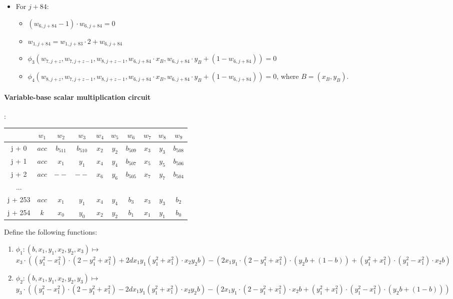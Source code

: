 \begin{itemize}
    \item For $j + 84$:
        \begin{itemize}
        	 \item $(w_{6, j + 84} - 1) \cdot w_{6, j + 84} = 0$ 
            \item $w_{1, j + 84} = w_{1, j + 83} \cdot 2 + w_{6, j + 84}$
            \item $\phi_3(w_{7, j + z}, w_{7, j + z - 1}, w_{8, j + z - 1}, w_{6, j + 84} \cdot x_B, w_{6, j + 84} \cdot y_B + (1 - w_{6, j + 84}) ) = 0$
            \item $\phi_4(w_{8, j + z}, w_{7, j + z - 1}, w_{8, j + z - 1}, w_{6, j + 84} \cdot x_B, w_{6, j + 84} \cdot y_B + (1 - w_{6, j + 84}) ) = 0$, where $B = (x_B, y_B)$.
        \end{itemize}
\end{itemize}

\paragraph{Variable-base scalar multiplication circuit}:
\begin{center}
    \begin{tabular}{ c|c|c|c|c|c|c|c|c|c }
        & $w_1$  & $w_2$  & $w_3$  & $w_4$  & $w_5$  & $w_6$ & $w_7$ & $w_8$ & $w_9$  \\
        \hline
        j + 0  & $acc$  & $b_{511}$ & $b_{510}$ & $x_2$   & $y_2$ & $b_{509}$  & $x_3$ & $y_3$ & $b_{508}$    \\
        j + 1  & $acc$ & $x_1$  & $ y_1$  & $x_4$ & $ y_4$ & $b_{507}$  & $x_5$ & $y_5$ & $b_{506}$ \\
        j + 2  & $acc$  & $--$ & $--$  & $x_6$ & $y_6$ & $b_{505}$ & $x_7$ & $y_7$  & $b_{504}$  \\
        ...     &             &            &           &             &           \\
        j + 253  & $acc$ & $x_1$  & $ y_1$  & $x_4$ & $ y_4$ & $b_{3}$  & $x_3$ & $y_3$ & $b_{2}$ \\
        j + 254  & $k$ & $x_0$ & $y_0$ & $x_2$ & $y_2$ & $b_{1}$   & $x_1$ & $y_1$  & $b_{0}$    \\
    \end{tabular}
\end{center}

Define the following functions:
\begin{enumerate}
    \item $\phi_1: (b, x_1, y_1, x_2, y_2, x_3) \mapsto $ \\
        $x_3 \cdot ((y_1^2 - x_1^2)\cdot(2 - y_1^2 + x_1^2) + 2dx_1y_1(y_1^2+x_1^2) \cdot x_2y_2b ) - (2x_1y_1\cdot(2 - y_1^2 +x_1^2)\cdot (y_2b + (1 - b)) + (y_1^2 + x_1^2)\cdot(y_1^2 - x_1^2)\cdot x_2 b)$

    \item $\phi_2: (b, x_1, y_1, x_2, y_2, y_3) \mapsto $ \\
        $y_3 \cdot ((y_1^2 - x_1^2)\cdot(2 - y_1^2 + x_1^2) - 2dx_1y_1(y_1^2+x_1^2) \cdot x_2y_2b ) - (2x_1y_1\cdot(2 - y_1^2 +x_1^2)\cdot x_2b + (y_1^2 + x_1^2)\cdot(y_1^2 - x_1^2)\cdot (y_2b + (1 - b)))$
\end{enumerate}

